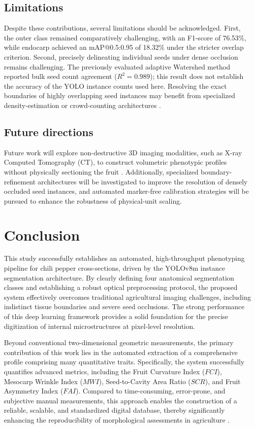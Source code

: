 \documentclass[final,5p,times,twocolumn]{elsarticle}
\begin{document}
\subsection*{Limitations}
Despite these contributions, several limitations should be acknowledged. First, the outer class remained comparatively challenging, with an F1-score of 76.53\%, while endocarp achieved an mAP@0.5:0.95 of 18.32\% under the stricter overlap criterion. Second, precisely delineating individual seeds under dense occlusion remains challenging. The previously evaluated adaptive Watershed method reported bulk seed count agreement ($R^2=0.989$); this result does not establish the accuracy of the YOLO instance counts used here. Resolving the exact boundaries of highly overlapping seed instances may benefit from specialized density-estimation or crowd-counting architectures \cite{x}.

\subsection*{Future directions}
Future work will explore non-destructive 3D imaging modalities, such as X-ray Computed Tomography (CT), to construct volumetric phenotypic profiles without physically sectioning the fruit \cite{x, fruitseg}. Additionally, specialized boundary-refinement architectures will be investigated to improve the resolution of densely occluded seed instances, and automated marker-free calibration strategies will be pursued to enhance the robustness of physical-unit scaling.


\section{Conclusion}
This study successfully establishes an automated, high-throughput phenotyping pipeline for chili pepper cross-sections, driven by the YOLOv8m instance segmentation architecture. By clearly defining four anatomical segmentation classes and establishing a robust optical preprocessing protocol, the proposed system effectively overcomes traditional agricultural imaging challenges, including indistinct tissue boundaries and severe seed occlusions. The strong performance of this deep learning framework provides a solid foundation for the precise digitization of internal microstructures at pixel-level resolution.

Beyond conventional two-dimensional geometric measurements, the primary contribution of this work lies in the automated extraction of a comprehensive profile comprising many quantitative traits. Specifically, the system successfully quantifies advanced metrics, including the Fruit Curvature Index ($FCI$), Mesocarp Wrinkle Index ($MWI$), Seed-to-Cavity Area Ratio ($SCR$), and Fruit Asymmetry Index ($FAI$). Compared to time-consuming, error-prone, and subjective manual measurements, this approach enables the construction of a reliable, scalable, and standardized digital database, thereby significantly enhancing the reproducibility of morphological assessments in agriculture \cite{gedil}.
\end{document}

